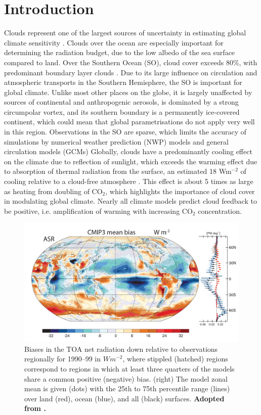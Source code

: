 \chapter{Introduction}

Clouds represent one of the largest sources of uncertainty in estimating global
climate sensitivity \citep{williams2017}. Clouds over the ocean
are especially important for determining the radiation budget, due to the
low albedo of the sea surface compared to land.
Over the Southern Ocean (SO),
cloud cover exceeds 80\%, with predominant boundary layer clouds \citep{mace2009}.
Due to its large influence on circulation and atmospheric transports in the
Southern Hemisphere, the SO is important for global climate. Unlike
most other places on the globe, it is largely unaffected by sources of
continental and anthropogenic aerosols, is dominated by a strong circumpolar
vortex, and its southern boundary is a permanently ice-covered continent,
which could mean that global parametrisations do not apply very well in this
region. Observations in the SO are sparse, which limits the accuracy
of simulations by numerical weather prediction (NWP) models and general
circulation models (GCMs)
Globally, clouds have a predominantly cooling effect on the climate due to reflection
of sunlight, which exceeds the warming effect due to absorption of thermal
radiation from the surface, an estimated 18 Wm$^{-2}$ of cooling relative to a cloud-free atmosphere
\citep{zelinka2017}. This effect is about 5 times as large as heating from
doubling of CO$_2$, which highlights the importance of cloud cover in modulating
global climate. Nearly all climate models predict cloud feedback to be positive,
i.e. amplification of warming with increasing CO$_2$ concentration.

\begin{figure}[t]
\centering
\includegraphics[width=\textwidth]{fig/trenberth-fassulo-sw-bias.png}
\caption{
Biases in the TOA net radiation down relative to observations regionally for
1990--99
in $Wm^{-2}$, where stippled (hatched) regions correspond to regions
in which at least three quarters of the models share a common
positive (negative) bias. (right) The model zonal mean is given
(dots) with the 25th to 75th percentile range (lines) over land (red),
ocean (blue), and all (black) surfaces. \textbf{Adopted from
\cite{trenberth2010}.}
}
\label{fig:trenberth-fassulo-sw-bias}
\end{figure}

